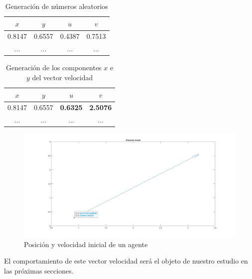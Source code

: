 \begin{table}[!h]
\caption{Generación de números aleatorios}
    \begin{center}
        \begin{tabular}{| c | c | c | c |}
            \hline
            $x$ & $y$ & $u$ & $v$ \\
            \hline
            0.8147 & 0.6557 & 0.4387 & 0.7513 \\
            \hline
            ... & ... & ... & ... \\
            \hline
        \end{tabular}
        \label{tab:XVi1}
    \end{center}
\end{table}
\begin{table}[!h]
\caption{Generación de los componentes $x$ e $y$ del vector velocidad}
    \begin{center}
        \begin{tabular}{| c | c | c | c |}
            \hline
            $x$ & $y$ & $u$ & $v$ \\
            \hline
            0.8147 & 0.6557 & \textbf{0.6325} & \textbf{2.5076} \\
            \hline
            ... & ... & ... & ... \\
            \hline
        \end{tabular}
        \label{tab:XVi2}
    \end{center}
\end{table}

\begin{figure}[!h]
  \centering
    \includegraphics[scale=0.2]{fig/cap04/unelemento.jpg}
  \caption{Posición y velocidad inicial de un agente}
  \label{fig:posInicial}
\end{figure}


El comportamiento de este vector velocidad será el objeto de nuestro estudio en las próximas secciones. 
